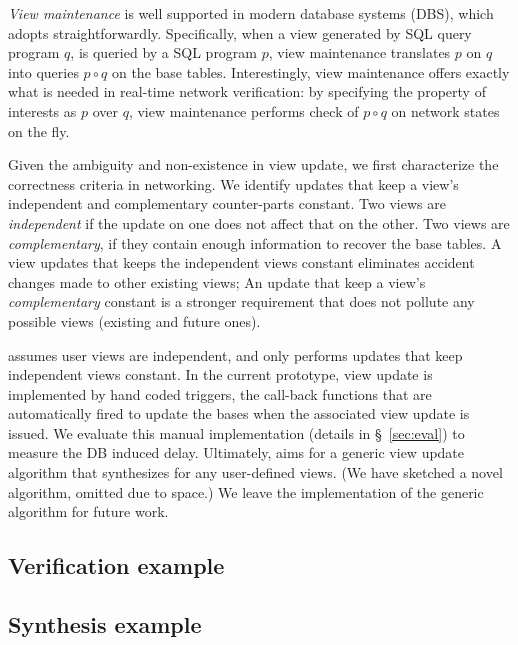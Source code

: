 \textit{View maintenance} is well supported in modern database systems
(DBS), which \Sys adopts straightforwardly. Specifically, when a view
generated by SQL query program $q$, is queried by a SQL program $p$,
view maintenance translates $p$ on $q$ into queries $p \circ q$ on the
base tables.
Interestingly, view maintenance offers exactly what is needed in
real-time network verification: by specifying the property of interests
as $p$ over $q$, view maintenance performs check of $p \circ q$ on
network states on the fly. %

Given the ambiguity and non-existence in view update, we first
characterize the correctness criteria in networking. We identify
updates that keep a view's independent and complementary counter-parts
constant. Two views are \textit{independent} if the update on one does
not affect that on the other. Two views are \textit{complementary}, if
they contain enough information to recover the base tables.
A view updates that keeps the independent views constant eliminates
accident changes made to other existing views; An update that keep a
view's \textit{complementary} constant is a stronger requirement that
does not pollute any possible views (existing and future ones).

\Sys assumes user views are independent, and only performs updates
that keep independent views constant.  In the current prototype, view
update is implemented by hand coded triggers, the call-back functions
that are automatically fired to update the bases when the associated
view update is issued. We evaluate this manual implementation (details
in \S~\ref{sec:eval}) to measure the DB induced delay.
Ultimately, \Sys aims for a generic view update algorithm that
synthesizes for any user-defined views. (We have sketched a novel
algorithm, omitted due to space.) We leave the implementation of the
generic algorithm for future work.

% 


\subsection{Verification example}

\subsection{Synthesis example}

